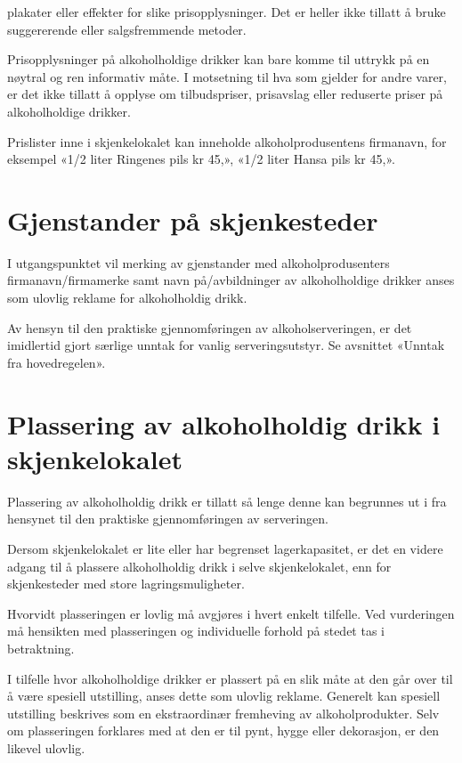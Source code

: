 plakater eller effekter for slike prisopplysninger. Det er heller ikke tillatt å bruke suggererende eller salgsfremmende metoder.

Prisopplysninger på alkoholholdige drikker kan bare komme til uttrykk på en nøytral og ren informativ måte. I motsetning til hva som gjelder for andre varer, er det ikke tillatt å opplyse om tilbudspriser, prisavslag eller reduserte priser på alkoholholdige drikker.

Prislister inne i skjenkelokalet kan inneholde alkoholprodusentens firmanavn, for eksempel «1/2 liter Ringenes pils kr 45,\textendash», «1/2 liter Hansa pils kr 45,\textendash».

\section{Gjenstander på skjenkesteder}

I utgangspunktet vil merking av gjenstander med alkoholprodusenters firmanavn/firmamerke samt navn på/avbildninger av alkoholholdige drikker anses som ulovlig reklame for alkoholholdig drikk.

Av hensyn til den praktiske gjennomføringen av alkoholserveringen, er det imidlertid gjort særlige unntak for vanlig serveringsutstyr. Se avsnittet «Unntak fra hovedregelen».

\section{Plassering av alkoholholdig drikk i skjenkelokalet}

Plassering av alkoholholdig drikk er tillatt så lenge denne kan begrunnes ut i fra hensynet til den praktiske gjennomføringen av serveringen.

Dersom skjenkelokalet er lite eller har begrenset lagerkapasitet, er det en videre adgang til å plassere alkoholholdig drikk i selve skjenkelokalet, enn for skjenkesteder med store lagringsmuligheter.

Hvorvidt plasseringen er lovlig må avgjøres i hvert enkelt tilfelle. Ved vurderingen må hensikten med plasseringen og individuelle forhold på stedet tas i betraktning.

I tilfelle hvor alkoholholdige drikker er plassert på en slik måte at den går over til å være spesiell utstilling, anses dette som ulovlig reklame. Generelt kan spesiell utstilling beskrives som en ekstraordinær fremheving av alkoholprodukter. Selv om plasseringen forklares med at den er til pynt, hygge eller dekorasjon, er den likevel ulovlig.

